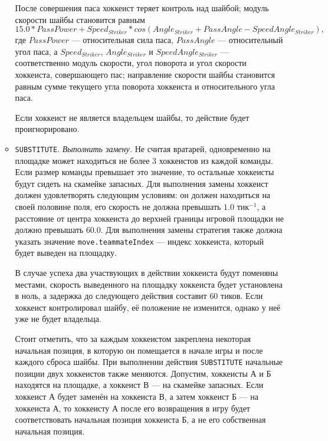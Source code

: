 \begin{itemize}
\begin{itemize}
          После совершения паса хоккеист теряет контроль над шайбой; модуль скорости шайбы становится равным
          \begin{equation}
          15.0*PassPower+Speed_{Striker}*cos(Angle_{Striker}+PassAngle-SpeedAngle_{Striker}),
          \end{equation}
          где $PassPower$ --- относительная сила паса, $PassAngle$ --- относительный угол паса, а $Speed_{Striker}$, $Angle_{Striker}$ и
          $SpeedAngle_{Striker}$ --- соответственно модуль скорости, угол поворота и угол скорости хоккеиста, совершающего пас; направление
          скорости шайбы становится равным сумме текущего угла поворота хоккеиста и относительного угла паса.

          Если хоккеист не является владельцем шайбы, то действие будет проигнорировано.
    \item \texttt{SUBSTITUTE}. \textit{Выполнить замену.} Не считая вратарей, одновременно на площадке может находиться не более $3$
          хоккеистов из каждой команды. Если размер команды превышает это значение, то остальные хоккеисты будут сидеть на скамейке
          запасных. Для выполнения замены хоккеист должен удовлетворять следующим условиям: он должен находиться на своей половине поля, его
          скорость не должна превышать $1.0$ тик$^{-1}$, а расстояние от центра хоккеиста до верхней границы игровой площадки не должно
          превышать $60.0$. Для выполнения замены стратегия также должна указать значение \texttt{move.teammateIndex} --- индекс хоккеиста,
          который будет выведен на площадку.

          В случае успеха два участвующих в действии хоккеиста будут поменяны местами, скорость выведенного на площадку хоккеиста будет
          установлена в ноль, а задержка до следующего действия составит $60$ тиков. Если хоккеист контролировал шайбу, её положение не
          изменится, однако у неё уже не будет владельца.

          Стоит отметить, что за каждым хоккеистом закреплена некоторая начальная позиция, в которую он помещается в начале игры и после
          каждого сброса шайбы. При выполнении действия \texttt{SUBSTITUTE} начальные позиции двух хоккеистов также меняются. Допустим,
          хоккеисты $А$ и $Б$ находятся на площадке, а хоккеист $В$ --- на скамейке запасных. Если хоккеист $А$ будет заменён на хоккеиста
          $В$, а затем хоккеист $Б$ --- на хоккеиста $А$, то хоккеисту $А$ после его возвращения в игру будет соответствовать начальная
          позиция хоккеиста $Б$, а не его собственная начальная позиция.
  \end{itemize}
\end{itemize}

